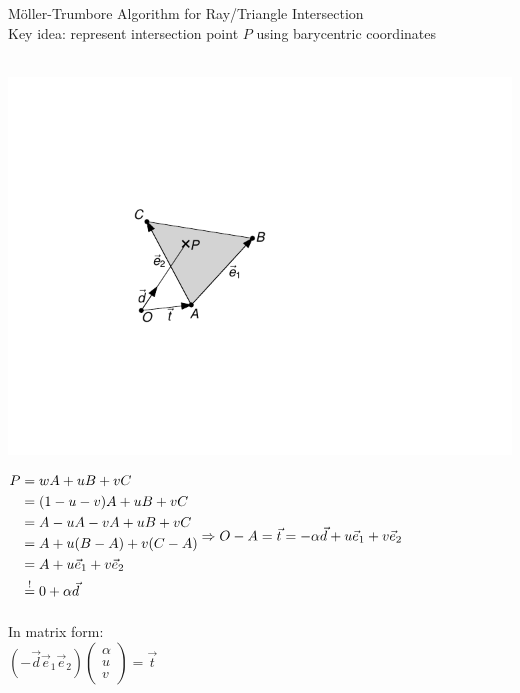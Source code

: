 \documentclass[utf8,stillsansserifmath,fleqn,t]{beamer}
\newcommand{\ds}{\displaystyle}
\begin{document}
\begin{frame}[label=möller-trumbore-0]
\frametitle{\insertsection}
Möller-Trumbore Algorithm for Ray/Triangle Intersection\\
Key idea: represent intersection point $P$ using barycentric coordinates\\~\\
\begin{minipage}{.39\textwidth}
\includegraphics[width=\textwidth]{./fig/triangle.pdf}
\end{minipage}\hfill
\begin{minipage}{.49\textwidth}
$\ds
\begin{aligned}
P &=wA+uB+vC\\
   &=(1-u-v)A+uB+vC\\
   &=A-uA-vA+uB+vC\\
   &=A+u(B-A)+v(C-A)\\
   &=A+u\vec{e}_1+v\vec{e}_2\\
   &\overset{!}{=}0+\alpha\vec{d}\\
\end{aligned}\\
\Rightarrow O-A = \vec{t} = -\alpha\vec{d}+u\vec{e}_1+v\vec{e}_2$\\
~\\
In matrix form:\\
$\ds (-\vec{d} \vec{e}_1 \vec{e}_2) \begin{pmatrix}\alpha\\u\\v\end{pmatrix} = \vec{t}$
\end{minipage}
\end{frame}
\end{document}
